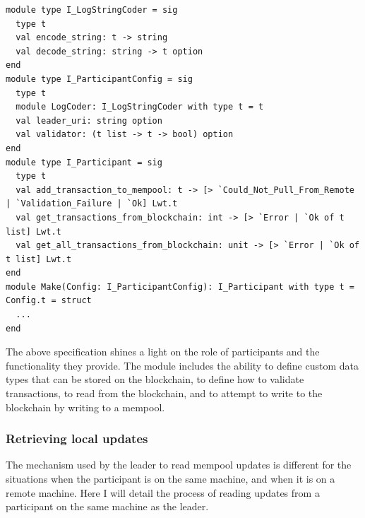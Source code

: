 \documentclass[12pt,a4paper,twoside,openright]{report}
\begin{document}
			\begin{lstlisting}
module type I_LogStringCoder = sig
  type t
  val encode_string: t -> string
  val decode_string: string -> t option
end
module type I_ParticipantConfig = sig
  type t
  module LogCoder: I_LogStringCoder with type t = t
  val leader_uri: string option
  val validator: (t list -> t -> bool) option
end
module type I_Participant = sig
  type t
  val add_transaction_to_mempool: t -> [> `Could_Not_Pull_From_Remote | `Validation_Failure | `Ok] Lwt.t
  val get_transactions_from_blockchain: int -> [> `Error | `Ok of t list] Lwt.t
  val get_all_transactions_from_blockchain: unit -> [> `Error | `Ok of t list] Lwt.t
end
module Make(Config: I_ParticipantConfig): I_Participant with type t = Config.t = struct
  ...
end
			\end{lstlisting}

			The above specification shines a light on the role of participants and the functionality they provide.
			The module includes the ability to define custom data types that can be stored on the blockchain, to define how to validate transactions, to read from the blockchain, and to attempt to write to the blockchain by writing to a mempool.

			\subsubsection*{Retrieving local updates}
			The mechanism used by the leader to read mempool updates is different for the situations when the participant is on the same machine, and when it is on a remote machine. 
			Here I will detail the process of reading updates from a participant on the same machine as the leader.\\
\end{document}

